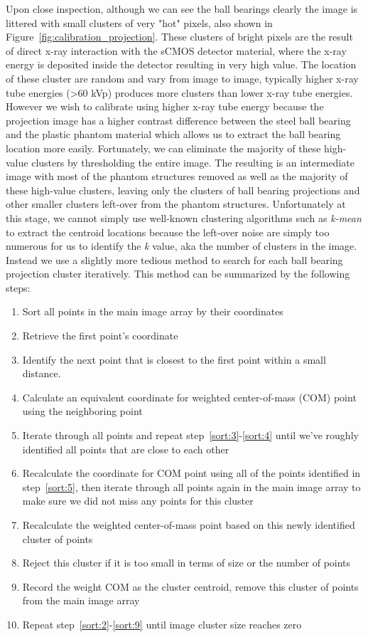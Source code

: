 Upon close inspection, although we can see the ball bearings clearly the image is littered with small clusters of very "hot" pixels, also shown in Figure~\ref{fig:calibration_projection}.  These clusters of bright pixels are the result of direct x-ray interaction with the sCMOS detector material, where the x-ray energy is deposited inside the detector resulting in very high value.  The location of these cluster are random and vary from image to image, typically higher x-ray tube energies (>60 kVp) produces more clusters than lower x-ray tube energies.  However we wish to calibrate using higher x-ray tube energy because the projection image has a higher contrast difference between the steel ball bearing and the plastic phantom material which allows us to extract the ball bearing location more easily.  Fortunately, we can eliminate the majority of these high-value clusters by thresholding the entire image.  The resulting is an intermediate image with most of the phantom structures removed as well as the majority of these high-value clusters, leaving only the clusters of ball bearing projections and other smaller clusters left-over from the phantom structures.  Unfortunately at this stage, we cannot simply use well-known clustering algorithms such as \textit{k-mean} to extract the centroid locations because the left-over noise are simply too numerous for us to identify the \textit{k} value, aka the number of clusters in the image.  Instead we use a slightly more tedious method to search for each ball bearing projection cluster iteratively.  This method can be summarized by the following steps:
\begin{enumerate}
\item \label{sort:1} Sort all points in the main image array by their coordinates
\item \label{sort:2} Retrieve the first point's coordinate
\item \label{sort:3} Identify the next point that is closest to the first point within a small distance.
\item \label{sort:4} Calculate an equivalent coordinate for weighted center-of-mass (COM) point using the neighboring point
\item \label{sort:5} Iterate through all points and repeat step~\ref{sort:3}-\ref{sort:4} until we've roughly identified all points that are close to each other
\item \label{sort:6} Recalculate the coordinate for COM point using all of the points identified in step~\ref{sort:5}, then iterate through all points again in the main image array to make sure we did not miss any points for this cluster
\item \label{sort:7} Recalculate the weighted center-of-mass point based on this newly identified cluster of points
\item \label{sort:8} Reject this cluster if it is too small in terms of size or the number of points
\item \label{sort:9} Record the weight COM as the cluster centroid, remove this cluster of points from the main image array
\item \label{sort:10} Repeat step~\ref{sort:2}-\ref{sort:9} until image cluster size reaches zero
\end{enumerate}

